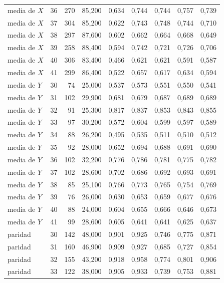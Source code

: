 \begin{table}[htbp]
{\begin{tabular}{@{}lrrrrrrrr@{}}
        media de $X$ & 36 & 270 & 85,200 & 0,634 & 0,744 & 0,744 & 0,757 & 0,739 \\
        media de $X$ & 37 & 304 & 85,200 & 0,622 & 0,743 & 0,748 & 0,744 & 0,710 \\
        media de $X$ & 38 & 297 & 87,600 & 0,602 & 0,662 & 0,664 & 0,668 & 0,649 \\
        media de $X$ & 39 & 258 & 88,400 & 0,594 & 0,742 & 0,721 & 0,726 & 0,706 \\
        media de $X$ & 40 & 306 & 83,400 & 0,466 & 0,621 & 0,621 & 0,591 & 0,587 \\
        media de $X$ & 41 & 299 & 86,400 & 0,522 & 0,657 & 0,617 & 0,634 & 0,594 \\
        media de $Y$ & 30 & 74 & 25,000 & 0,537 & 0,573 & 0,551 & 0,550 & 0,541 \\
        media de $Y$ & 31 & 102 & 29,900 & 0,681 & 0,679 & 0,687 & 0,689 & 0,689 \\
        media de $Y$ & 32 & 91 & 25,300 & 0,817 & 0,837 & 0,853 & 0,843 & 0,855 \\
        media de $Y$ & 33 & 97 & 30,200 & 0,572 & 0,604 & 0,599 & 0,597 & 0,589 \\
        media de $Y$ & 34 & 88 & 26,200 & 0,495 & 0,535 & 0,511 & 0,510 & 0,512 \\
        media de $Y$ & 35 & 92 & 28,000 & 0,652 & 0,694 & 0,688 & 0,691 & 0,690 \\
        media de $Y$ & 36 & 102 & 32,200 & 0,776 & 0,786 & 0,781 & 0,775 & 0,782 \\
        media de $Y$ & 37 & 102 & 28,600 & 0,702 & 0,686 & 0,692 & 0,693 & 0,691 \\
        media de $Y$ & 38 & 85 & 25,100 & 0,766 & 0,773 & 0,765 & 0,754 & 0,769 \\
        media de $Y$ & 39 & 76 & 26,000 & 0,630 & 0,653 & 0,659 & 0,677 & 0,676 \\
        media de $Y$ & 40 & 88 & 24,000 & 0,604 & 0,655 & 0,666 & 0,646 & 0,673 \\
        media de $Y$ & 41 & 99 & 28,600 & 0,605 & 0,641 & 0,641 & 0,625 & 0,637 \\
        paridad & 30 & 142 & 48,000 & 0,901 & 0,925 & 0,746 & 0,775 & 0,871 \\
        paridad & 31 & 160 & 46,900 & 0,909 & 0,927 & 0,685 & 0,727 & 0,854 \\
        paridad & 32 & 155 & 43,200 & 0,918 & 0,958 & 0,774 & 0,801 & 0,906 \\
        paridad & 33 & 122 & 38,000 & 0,905 & 0,933 & 0,739 & 0,753 & 0,881 \\

\end{tabular}}
\end{table}
